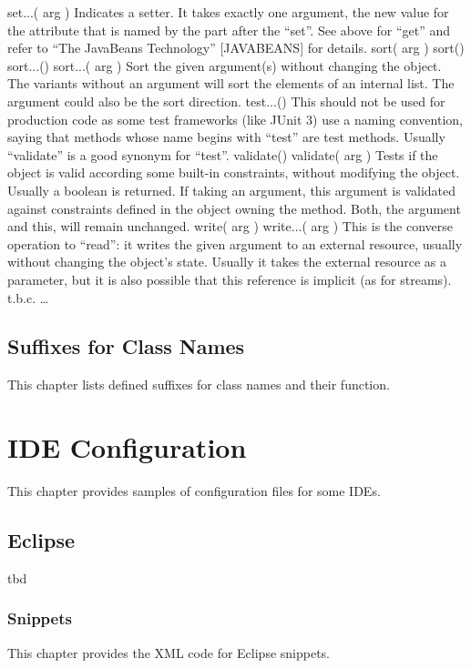 \documentclass[12pt,a4paper,titlepage, parskip=half, headsepline, footsepline, cleardoubleplain]{scrbook}
\begin{document}
set...( arg )
Indicates a setter. It takes exactly one argument, the new value for the attribute that is named by the part after the “set”. See above for “get” and refer to “The JavaBeans Technology” [JAVABEANS] for details.
sort( arg )
sort()
sort...()
sort...( arg )
Sort the given argument(s) without changing the object.
The variants without an argument will sort the elements of an internal list.
The argument could also be the sort direction.
test...()
This should not be used for production code as some test frameworks (like JUnit 3) use a naming convention, saying that methods whose name begins with “test” are test methods.
Usually “validate” is a good synonym for “test”.
validate()
validate( arg )
Tests if the object is valid according some built-in constraints, without modifying the object. Usually a boolean is returned.
If taking an argument, this argument is validated against constraints defined in the object owning the method. Both, the argument and this, will remain unchanged.
write( arg )
write...( arg )
This is the converse operation to “read”: it writes the given argument to an external resource, usually without changing the object’s state.
Usually it takes the external resource as a parameter, but it is also possible that this reference is implicit (as for streams).
t.b.c.
…


\subsection{Suffixes for Class Names}
This chapter lists defined suffixes for class names and their function.

\renewcommand{\cellalign}{tl}

\section{IDE Configuration}\label{sec:IDEConfiguration}
This chapter provides samples of configuration files for some IDEs.

\subsection{Eclipse}\label{sec:EclipseConfiguration}
tbd
\subsubsection{Snippets}
This chapter provides the XML code for Eclipse snippets.
\end{document}
